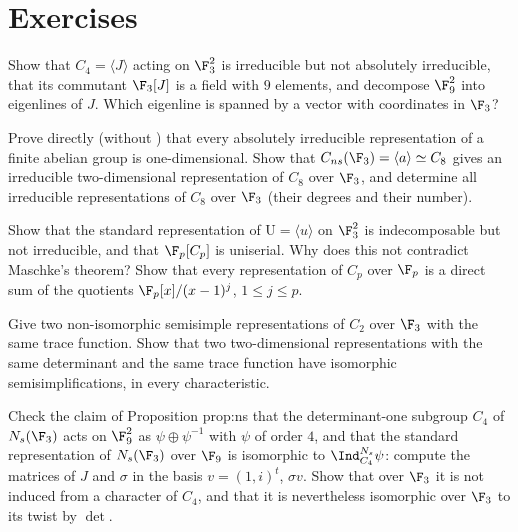 \section{Exercises}\label{sec:reps:exercises}

\begin{exercise}\label{ex:reps:ex1}
Show that $C_4=\langle J\rangle$ acting on $\F_3^2$ is irreducible but not absolutely irreducible, that its commutant $\F_3[J]$ is a field with $9$ elements,
and decompose $\F_9^2$ into eigenlines of $J$. Which eigenline is spanned by a vector with coordinates in $\F_3$?
\end{exercise}

\begin{exercise}\label{ex:reps:ex2}
Prove directly (without ) that every absolutely irreducible representation of a finite abelian group is one-dimensional.
Show that $C_{ns}(\F_3)=\langle a\rangle\simeq C_8$ gives an irreducible two-dimensional representation of $C_8$ over $\F_3$, and determine all irreducible
representations of $C_8$ over $\F_3$ (their degrees and their number).
\end{exercise}

\begin{exercise}\label{ex:reps:ex3}
Show that the standard representation of $\mathrm U=\langle u\rangle$ on $\F_3^2$ is indecomposable but not irreducible, and that $\F_p[C_p]$ is uniserial.
Why does this not contradict Maschke's theorem? Show that every representation of $C_p$ over $\F_p$ is a direct sum of the quotients
$\F_p[x]/(x-1)^j$, $1\le j\le p$.
\end{exercise}

\begin{exercise}\label{ex:reps:ex4}
Give two non-isomorphic semisimple representations of $C_2$ over $\F_3$ with the same trace function. Show that two two-dimensional
representations with the same determinant and the same trace function have isomorphic semisimplifications, in every characteristic.
\end{exercise}

\begin{exercise}\label{ex:reps:ex5}
Check the claim of Proposition prop:ns that the determinant-one subgroup $C_4$ of $N_s(\F_3)$ acts on $\F_9^2$ as $\psi\oplus\psi^{-1}$ with $\psi$ of order $4$, and
that the standard representation of $N_s(\F_3)$ over $\F_9$ is isomorphic to $\Ind_{C_4}^{N_s}\psi$: compute the matrices of $J$ and $\sigma$ in the basis
$v=(1,i)^t$, $\sigma v$. Show that over $\F_3$ it is not induced from a character of $C_4$, and that it is nevertheless isomorphic over $\F_3$ to its twist by $\det$.
\end{exercise}

